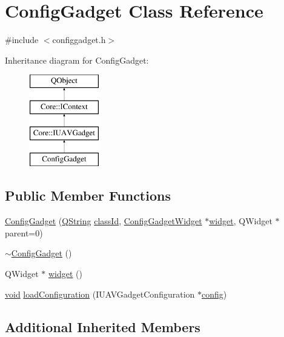 \hypertarget{class_config_gadget}{\section{Config\-Gadget Class Reference}
\label{class_config_gadget}
}


{\ttfamily \#include $<$configgadget.\-h$>$}

Inheritance diagram for Config\-Gadget\-:\begin{figure}[H]
\begin{center}
\leavevmode
\includegraphics[height=4.000000cm]{class_config_gadget}
\end{center}
\end{figure}
\subsection*{Public Member Functions}
\begin{DoxyCompactItemize}
\item 
\hyperlink{group___config_plugin_gae5427c3bad5fe19de2f24710fd629d87}{Config\-Gadget} (\hyperlink{group___u_a_v_objects_plugin_gab9d252f49c333c94a72f97ce3105a32d}{Q\-String} \hyperlink{group___core_plugin_ga3878fde66a57220608960bcc3fbeef2c}{class\-Id}, \hyperlink{class_config_gadget_widget}{Config\-Gadget\-Widget} $\ast$\hyperlink{group___config_plugin_ga678f4bf881dd4095ab62f66d69c32546}{widget}, Q\-Widget $\ast$parent=0)
\item 
\hyperlink{group___config_plugin_ga6fbabaaacad7e51739c18053d5aa83fd}{$\sim$\-Config\-Gadget} ()
\item 
Q\-Widget $\ast$ \hyperlink{group___config_plugin_ga678f4bf881dd4095ab62f66d69c32546}{widget} ()
\item 
\hyperlink{group___u_a_v_objects_plugin_ga444cf2ff3f0ecbe028adce838d373f5c}{void} \hyperlink{group___config_plugin_ga43acf4e389daaf28085a3773b4abc903}{load\-Configuration} (I\-U\-A\-V\-Gadget\-Configuration $\ast$\hyperlink{deflate_8c_a4473b5227787415097004fd39f55185e}{config})
\end{DoxyCompactItemize}
\subsection*{Additional Inherited Members}


